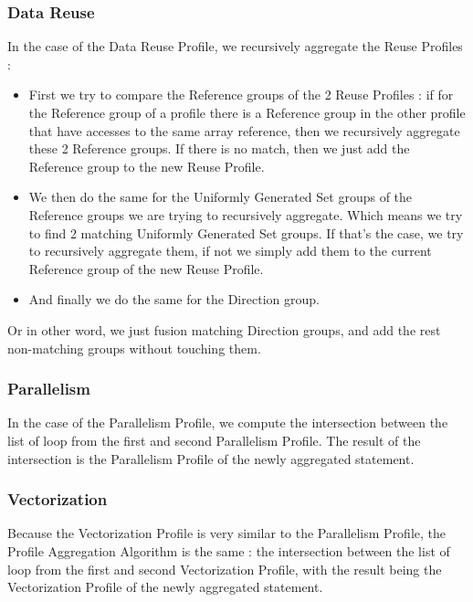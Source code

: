 \documentclass[paper=a4, fontsize=11.5pt]{scrartcl}
\numberwithin{equation}{section}        %
\numberwithin{figure}{section}          %
\numberwithin{table}{section}               %
\begin{document}
        \subsubsection{Data Reuse}
            In the case of the Data Reuse Profile, we recursively aggregate the Reuse Profiles :
            \begin{itemize}
                \item First we try to compare the Reference groups of the 2 Reuse Profiles :
                    if for the Reference group of a profile there is a Reference group in
                    the other profile that have accesses to the same array reference, then
                    we recursively aggregate these 2 Reference groups. If there is no
                    match, then we just add the Reference group to the new Reuse Profile.
                \item We then do the same for the Uniformly Generated Set groups of the
                    Reference groups we are trying to recursively aggregate. Which means we
                    try to find 2 matching Uniformly Generated Set groups.
                    If that's the case, we try to recursively aggregate them, if not we simply
                    add them to the current Reference group of the new Reuse Profile.
                \item And finally we do the same for the Direction group.
            \end{itemize}
            
            Or in other word, we just fusion matching Direction groups,
            and add the rest non-matching groups without touching them.
        \subsubsection{Parallelism}
            In the case of the Parallelism Profile, we compute the intersection between
            the list of loop from the first and second Parallelism Profile. The result
            of the intersection is the Parallelism Profile of the newly aggregated statement.
        \subsubsection{Vectorization}
            Because the Vectorization Profile is very similar to the Parallelism Profile, 
            the Profile Aggregation Algorithm is the same : the intersection between the
            list of loop from the first and second Vectorization Profile, with the result
            being the Vectorization Profile of the newly aggregated statement.
\end{document}
